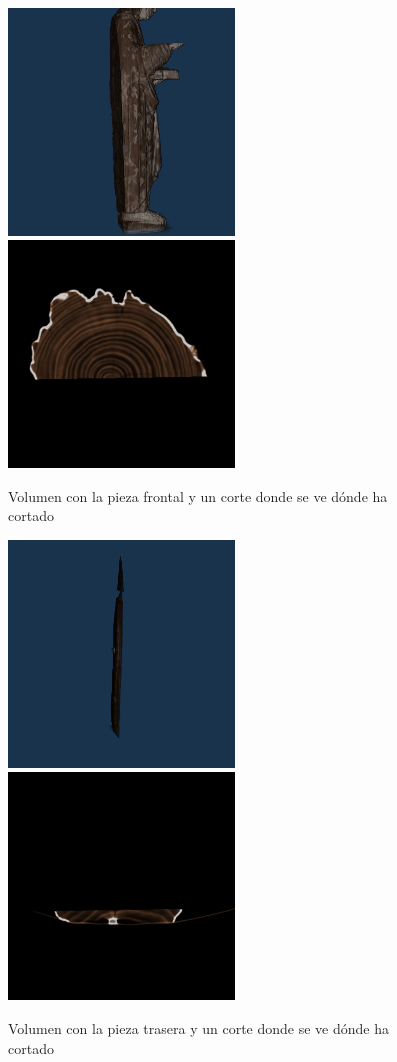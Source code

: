 \begin{figure}[H]
	\centering
	\includegraphics[width=6cm]{imagenes/resultados/segmentacion/san-juan-evangelista/frontal-3d}
	\includegraphics[width=6cm]{imagenes/resultados/segmentacion/san-juan-evangelista/frontal-corte}
	\caption{Volumen con la pieza frontal y un corte donde se ve dónde ha cortado}
	\label{fig:resultados/segmentacion/san-juan-evangelista/frontal}
\end{figure}

\begin{figure}[H]
	\centering
	\includegraphics[width=6cm]{imagenes/resultados/segmentacion/san-juan-evangelista/trasero-3d}
	\includegraphics[width=6cm]{imagenes/resultados/segmentacion/san-juan-evangelista/trasero-corte}
	\caption{Volumen con la pieza trasera y un corte donde se ve dónde ha cortado}
	\label{fig:resultados/segmentacion/san-juan-evangelista/trasero}
\end{figure}